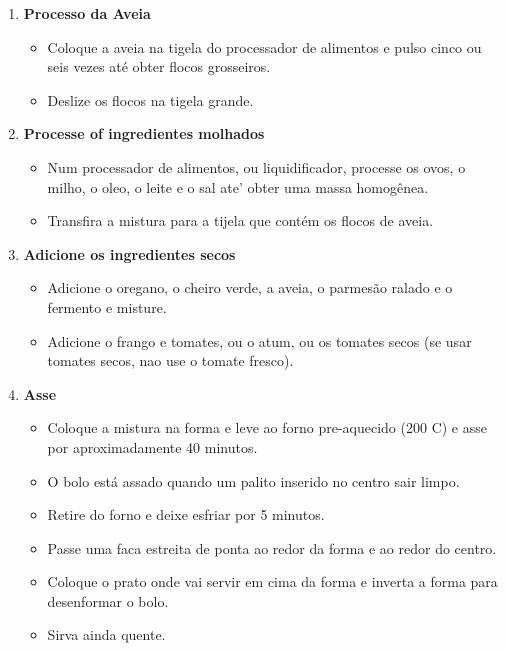 \documentclass[11pt,letterpaper]{article}
\newcommand \fileName {BoloCaipiraComAveia}
\begin{document}
\begin{description}
\begin{enumerate}
	\item {\bf Processo da Aveia}
	\begin{itemize}
	\item Coloque a aveia na tigela do processador de alimentos e pulso cinco ou seis vezes at\'e obter flocos grosseiros.
	\item Deslize os flocos na tigela grande.
	\end {itemize}

	\item {\bf Processe of ingredientes molhados}
	\begin{itemize}
	\item Num processador de alimentos, ou liquidificador, processe os ovos, o milho, o oleo, o leite e o sal ate' obter uma massa homog\^enea.
        \item Transfira a mistura para a tijela que cont\'em os flocos de aveia.
	\end{itemize}
	\item {\bf Adicione os ingredientes secos}
	\begin{itemize}
	\item Adicione o oregano, o cheiro verde, a aveia, o parmes\~ao ralado e o fermento e misture.
	\item  Adicione o frango e tomates, ou o atum, ou os tomates secos (se usar tomates secos, nao use o tomate fresco).
	\end{itemize}
	\item {\bf Asse}
	\begin{itemize}
	\item Coloque a mistura na forma e leve ao forno pre-aquecido (200 C) e asse por aproximadamente 40 minutos.
	\item O bolo est\'a assado quando um palito inserido no centro sair limpo.
	\item Retire do forno e deixe esfriar por 5 minutos.
	\item Passe uma faca estreita de ponta ao redor da forma e ao redor do centro.
	\item Coloque o prato onde vai servir em cima da forma e inverta a forma para desenformar o bolo.
	\item Sirva ainda quente.
	\end{itemize}
	\end{enumerate}
\end{description}


\end{document}

